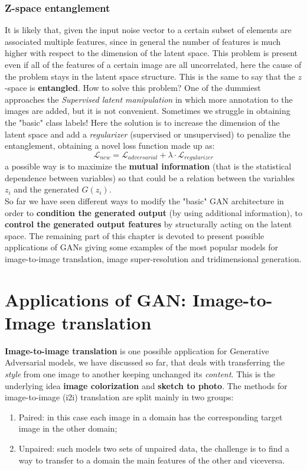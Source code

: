 \subsubsection{Z-space entanglement}
It is likely that, given the input noise vector to a certain subset of elements are associated multiple features, since in general the number of features is much higher with respect to the dimension of the latent space. This problem is present even if all of the features of a certain image are all uncorrelated, here the cause of the problem stays in the latent space structure. This is the same to say that the $z$-space is \textbf{entangled}. How to solve this problem? One of the dummiest approaches the \textit{Supervised latent manipulation} in which more annotation to the images are added, but it is not convenient. Sometimes we struggle in obtaining the "basic" class labels! Here the solution is to increase the dimension of the latent space and add a \textit{regularizer} (supervised or unsupervised) to penalize the entanglement, obtaining a novel loss function made up as:
\begin{equation*}
    \mathcal{L}_{new}=\mathcal{L}_{adversarial} + \lambda \cdot \mathcal{L}_{regularizer}
\end{equation*}
a possible way is to maximize the \textbf{mutual information} (that is the statistical dependence between variables) so that could be a relation between the variables $z_i$ and the generated $G(z_i)$.\\

So far we have seen different ways to modify the "basic" GAN architecture in order to \textbf{condition the generated output} (by using additional information), to \textbf{control the generated output features} by structurally acting on the latent space. The remaining part of this chapter is devoted to present possible applications of GANs giving some examples of the most popular models for image-to-image translation, image super-resolution and tridimensional generation.




\section{Applications of GAN: Image-to-Image translation}
\textbf{Image-to-image translation} is one possible application for Generative Adversarial models, we have discussed so far, that deals with transferring the \textit{style} from one image to another keeping unchanged its \textit{content}. This is the underlying idea \textbf{image colorization} and \textbf{sketch to photo}. The methods for image-to-image (i2i) translation are split mainly in two groups:
\begin{enumerate}
    \itemsep-0.2em
    \item \textsf{Paired}: in this case each image in a domain has  the corresponding target image in the other domain; 
    \item \textsf{Unpaired}: such models two sets of unpaired data, the challenge is to find a way to transfer to a domain the main features of the other and viceversa.
\end{enumerate}

